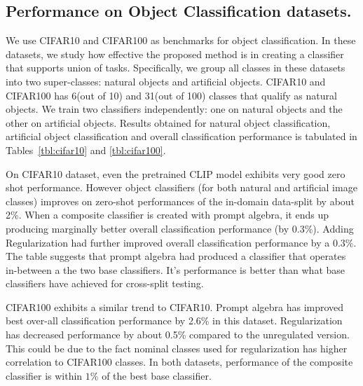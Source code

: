 \documentclass[10pt,twocolumn,letterpaper]{article}
\begin{document}
\subsection{Performance on Object Classification datasets.} We use CIFAR10\cite{cifar10} and CIFAR100\cite{cifar100} as benchmarks for object classification. In these datasets, we study how effective the proposed method is in creating a classifier that supports union of tasks. Specifically, we group all classes in these datasets into two super-classes: natural objects and artificial objects. CIFAR10 and CIFAR100 has 6(out of 10) and 31(out of 100) classes that qualify as natural objects. We train two classifiers independently: one on natural objects and the other on artificial objects. Results obtained for natural object classification, artificial object classification and overall classification performance is tabulated in  Tables~\ref{tbl:cifar10} and \ref{tbl:cifar100}. 

On CIFAR10 dataset, even the pretrained CLIP model exhibits very good zero shot performance. However  object classifiers (for both natural and artificial image classes) improves on zero-shot performances of the in-domain data-split by about 2\%. When a composite classifier is created with prompt algebra, it ends up producing marginally better overall classification performance (by 0.3\%). Adding Regularization had further improved overall classification performance by a 0.3\%. The table suggests that prompt algebra had produced a classifier that operates in-between a the two base classifiers. It's performance is better than what base classifiers have achieved for cross-split testing. 

CIFAR100 exhibits a similar trend to CIFAR10. Prompt algebra has improved best over-all classification performance by 2.6\% in this dataset. Regularization has decreased performance by about 0.5\% compared to the unregulated version. This could be due to the fact nominal classes used for regularization has higher correlation to CIFAR100 classes. In both datasets, performance of the composite classifier is within $1\%$ of the best base classifier. \\
\end{document}
